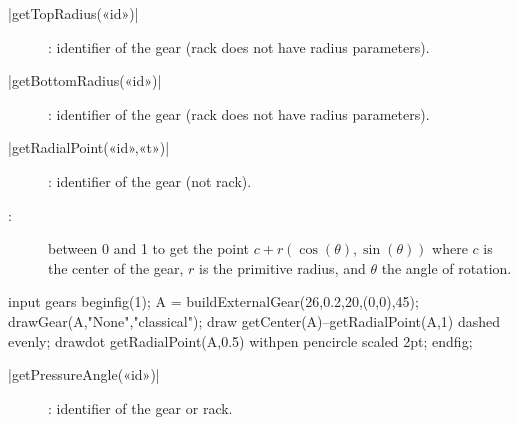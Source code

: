\documentclass[english]{ltxdoc}
\begin{document}
\begin{colourband}
\commande|getTopRadius(«id»)|\smallskip{}
\begin{description}
  \item[]:  identifier of the gear (rack does not have
  radius parameters). 
\end{description}
\end{colourband}


\begin{colourband}
\commande|getBottomRadius(«id»)|\smallskip{}
\begin{description}
  \item[]:  identifier of the gear (rack does not have
  radius parameters). 
\end{description}
\end{colourband}


\begin{colourband}
\commande|getRadialPoint(«id»,«t»)|\smallskip{}
\begin{description}
  \item[]:  identifier of the gear (not rack).
  \item[:]  between 0 and 1 to get the point
  $c+r(\cos(\theta),\sin(\theta))$ where $c$ is the center of the gear, $r$ is
  the primitive radius, and $\theta$ the angle of rotation.  
\end{description}
\end{colourband}
\label{com:radialPoint}
\begin{ExempleMP}
input gears
beginfig(1);
A = buildExternalGear(26,0.2,20,(0,0),45);
drawGear(A,"None","classical");
draw getCenter(A)--getRadialPoint(A,1) dashed evenly;
drawdot getRadialPoint(A,0.5) withpen pencircle scaled 2pt;
endfig;
\end{ExempleMP}



\begin{colourband}
\commande|getPressureAngle(«id»)|\smallskip{}
\begin{description}
  \item[]:  identifier of the gear or rack. 
\end{description}
\end{colourband}
\end{document}
